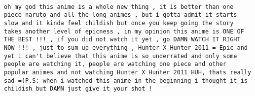 \documentclass[
]{article}
\begin{document}
\begin{verbatim}
                                                                                                                                                                                                                                                                                                                                                                                                                                                                                                                                                                                                                                                                                                                                                                                                                                                                                                                                                                                                     oh my god this anime is a whole new thing , it is better than one piece naruto and all the long animes , but i gotta admit it starts slow and it kinda feel childish but once you keep going the story takes another level of epicness , in my opinion this anime is ONE OF THE BEST !!! , if you did not watch it yet , go DAMN WATCH IT RIGHT NOW !!! , just to sum up everything , Hunter X Hunter 2011 = Epic and yet i can't believe that this anime is so underrated and only some people are watching it, people are watching one piece and other popular animes and not watching Hunter X Hunter 2011 HUH, thats really sad =(P.S: when i watched this anime in the beginning i thought it is childish but DAMN just give it your shot !

\end{verbatim}
\end{document}
